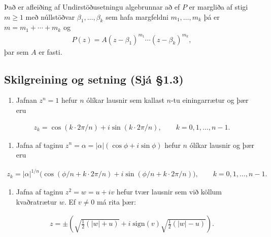 \documentclass[a4paper,10pt,icelandic]{sphinxmanual}
\begin{document}
Það er afleiðing af Undirstöðusetningu algebrunnar að ef \(P\) er
margliða af stigi \(m\geq 1\) með núllstöðvar
\(\beta_1, \ldots, \beta_k\) sem hafa margfeldni
\(m_1,\ldots, m_k\) þá er \(m=m_1+\cdots+m_k\) og
\begin{equation*}
\begin{split}P(z)=A(z-\beta_1)^{m_1}\cdots(z-\beta_k)^{m_k},\end{split}
\end{equation*}
þar sem \(A\) er fasti.


\subsection{Skilgreining og setning (Sjá \S{}1.3)}
\label{\detokenize{Kafli01:skilgreining-og-setning-sja-1-3}}\begin{enumerate}
%
\item {} 
Jafnan \(z^n=1\) hefur \(n\) ólíkar lausnir sem kallast \(n\)-tu einingarrætur og þær eru

\end{enumerate}
\begin{equation*}
\begin{split}z_k=\cos (k\cdot 2\pi/n)+i\sin (k\cdot 2\pi/n),\qquad k=0, 1, \ldots, n-1.\end{split}
\end{equation*}\begin{enumerate}
%
\setcounter{enumi}{1}
\item {} 
Jafna af taginu \(z^n=\alpha=|\alpha|(\cos\phi+i\sin\phi)\) hefur \(n\) ólíkar lausnir og þær eru

\end{enumerate}
\begin{equation*}
\begin{split}z_k=|\alpha|^{1/n}\big(\cos (\phi/n+k\cdot 2\pi/n)+
i\sin (\phi/n+k\cdot 2\pi/n)\big),\qquad k=0, 1, \ldots, n-1.\end{split}
\end{equation*}\begin{enumerate}
%
\setcounter{enumi}{2}
\item {} 
Jafna af taginu \(z^2=w=u+iv\) hefur tvær lausnir sem við köllum kvaðratrætur \(w\). Ef \(v\neq 0\) má rita þær:

\end{enumerate}
\begin{equation*}
\begin{split}z= \pm\left(\sqrt{\tfrac{1}{2}(|w|+u)}+i\;\mathrm{sign}(v)\sqrt{\tfrac{1}{2}(|w|-u)}\right).\end{split}
\end{equation*}
\end{document}
